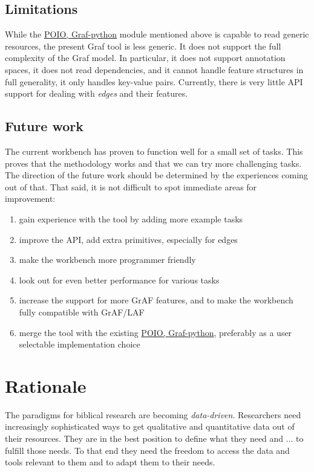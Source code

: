\documentclass[letterpaper,10pt,english]{sphinxmanual}
\begin{document}
\subsection{Limitations}
\label{overview:limitations}
While the \href{http://media.cidles.eu/poio/graf-python/}{POIO, Graf-python} module
mentioned above is capable to read generic resources, the present Graf tool is less generic.
It does not support the full complexity of the Graf model.
In particular, it does not support annotation spaces, it does not read dependencies,
and it cannot handle feature structures in full generality, it only handles key-value pairs.
Currently, there is very little API support for dealing with \emph{edges} and their features.


\subsection{Future work}
\label{overview:future-work}
The current workbench has proven to function well for a small set of tasks.
This proves that the methodology works and that we can try more challenging tasks.
The direction of the future work should be determined by the experiences coming out of that.
That said, it is not difficult to spot immediate areas for improvement:
\begin{enumerate}
\item {} 
gain experience with the tool by adding more example tasks

\item {} 
improve the API, add extra primitives, especially for edges

\item {} 
make the workbench more programmer friendly

\item {} 
look out for even better performance for various tasks

\item {} 
increase the support for more GrAF features, and to make the workbench fully compatible with GrAF/LAF

\item {} 
merge the tool with the existing \href{http://media.cidles.eu/poio/graf-python/}{POIO, Graf-python},
preferably as a user selectable implementation choice

\end{enumerate}


\section{Rationale}
\label{overview:rationale}
The paradigms for biblical research are becoming \emph{data-driven}.
Researchers need increasingly sophisticated ways to get qualitative and quantitative data out of their resources.
They are in the best position to define what they need and ... to fulfill those needs.
To that end they need the freedom to access the data and tools relevant to them and to adapt them to their needs.
\end{document}
